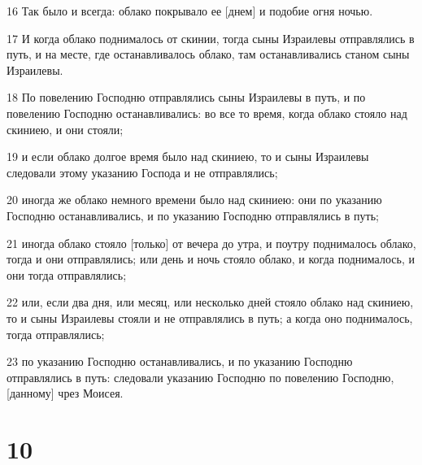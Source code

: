 \par 16 Так было и всегда: облако покрывало ее [днем] и подобие огня ночью.
\par 17 И когда облако поднималось от скинии, тогда сыны Израилевы отправлялись в путь, и на месте, где останавливалось облако, там останавливались станом сыны Израилевы.
\par 18 По повелению Господню отправлялись сыны Израилевы в путь, и по повелению Господню останавливались: во все то время, когда облако стояло над скиниею, и они стояли;
\par 19 и если облако долгое время было над скиниею, то и сыны Израилевы следовали этому указанию Господа и не отправлялись;
\par 20 иногда же облако немного времени было над скиниею: они по указанию Господню останавливались, и по указанию Господню отправлялись в путь;
\par 21 иногда облако стояло [только] от вечера до утра, и поутру поднималось облако, тогда и они отправлялись; или день и ночь стояло облако, и когда поднималось, и они тогда отправлялись;
\par 22 или, если два дня, или месяц, или несколько дней стояло облако над скиниею, то и сыны Израилевы стояли и не отправлялись в путь; а когда оно поднималось, тогда отправлялись;
\par 23 по указанию Господню останавливались, и по указанию Господню отправлялись в путь: следовали указанию Господню по повелению Господню, [данному] чрез Моисея.

\chapter{10}

